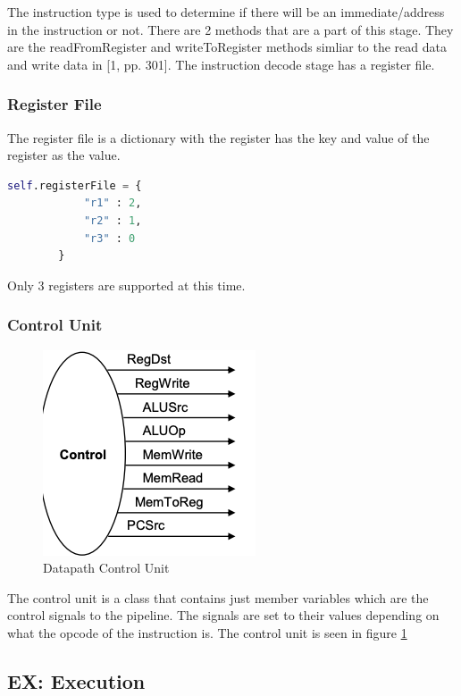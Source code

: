 \documentclass[conference]{IEEEtran}
\begin{document}
The instruction type is used to determine if there will be an immediate/address in the instruction or not.  There are 2 methods that are a part of this stage.  They are the readFromRegister and writeToRegister methods simliar to the read data and write data in [1, pp. 301].
The instruction decode stage has a register file.

\subsubsection{Register File}

The register file is a dictionary with the register has the key and value of the register as the value.
\begin{lstlisting}[language=Python]
self.registerFile = {
            "r1" : 2,
            "r2" : 1,
            "r3" : 0
        }
\end{lstlisting}
Only 3 registers are supported at this time.

\subsubsection{Control Unit}

\begin{figure}
    \centering
    \includegraphics[scale=.4]{controlunit.png}
    \caption{Datapath Control Unit}
    \label{fig:controlunit}
\end{figure}

The control unit is a class that contains just member variables which are the control signals to the pipeline.  The signals are set to their values depending on what the opcode of the instruction is.  The control unit is seen in figure \ref{fig:controlunit}

\subsection{EX: Execution}
\end{document}
